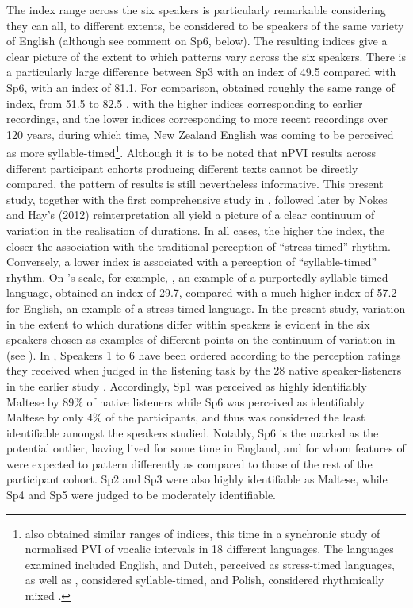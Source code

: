 \documentclass[output=paper]{langsci/langscibook}
\begin{document}
The index range across the six speakers is particularly remarkable
considering they can all, to different extents, be considered to be
speakers of the same variety of English (although see comment on Sp6,
below). The resulting indices give a clear picture of the extent to
which  patterns vary across the six speakers. There is a
particularly large difference between Sp3 with an index of 49.5
compared with Sp6, with an index of 81.1. For comparison,
\citet{NokesHay2012} obtained roughly the same range of index, from
51.5 to 82.5 \citep[11]{NokesHay2012}, with the higher indices
corresponding to earlier recordings, and the lower indices
corresponding to more recent recordings over 120 years, during which
time, New Zealand English was coming to be perceived as more
syllable-timed\footnote{\citet{GrabeLow2002} also obtained similar
  ranges of indices, this time in a synchronic study of normalised PVI
  of vocalic intervals in 18 different languages. The languages
  examined included English,  and Dutch, perceived as
  stress-timed languages, as well as , considered
  syllable-timed, and Polish, considered rhythmically mixed \citep{GrabeLow2002}.}. Although it is to be noted that nPVI results across
different participant cohorts producing different texts cannot be
directly compared, the pattern of results is still nevertheless
informative. This present study, together with the first comprehensive
study in \citet{GrabeLow2002}, followed later by Nokes and Hay's
(2012) reinterpretation all yield a picture of a clear continuum of
variation in the realisation of  durations. In all cases, the
higher the index, the closer the association with the traditional
perception of “stress-timed” rhythm. Conversely, a lower index is
associated with a perception of “syllable-timed” rhythm. On
\citet{GrabeLow2002}'s scale, for example, , an example of a
  purportedly syllable-timed language, obtained an index of 29.7,
  compared with a much higher index of 57.2 for English, an example of
  a stress-timed language.  In the present study, variation in the
  extent to which  durations differ within speakers is evident in
  the six speakers chosen as examples of different points on the
  continuum of variation in  (see ). In
  , Speakers 1 to 6 have been ordered according
  to the perception ratings they received when judged in the listening
  task by the 28 native  speaker-listeners in the earlier study
  \citep{Grech2015}. Accordingly, Sp1 was perceived as highly identifiably
  Maltese by 89\% of native  listeners while Sp6 was perceived as
  identifiably Maltese by only 4\% of the participants, and thus was
  considered the least identifiable amongst the  speakers
  studied. Notably, Sp6 is the  marked as the potential
  outlier, having lived for some time in England, and for whom
  features of  were expected to pattern differently as
  compared to those of the rest of the participant cohort. Sp2 and Sp3
  were also highly identifiable as Maltese, while Sp4 and Sp5 were
  judged to be moderately identifiable.
\end{document}
